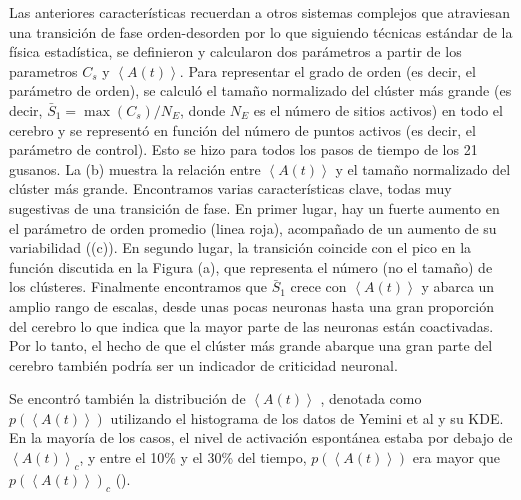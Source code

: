 Las anteriores  características recuerdan a otros sistemas complejos que atraviesan una transición de fase orden-desorden
por lo que siguiendo técnicas estándar de la  física estadística, se definieron y calcularon dos parámetros a partir de los parametros $C_s$ y $\left\langle A(t) \right\rangle$.  Para representar el grado de orden (es decir, el parámetro de orden), se calculó el tamaño normalizado del clúster más grande (es decir, $\bar{S}_1 = \max(C_s)/N_{E}$, donde $N_E$  es el número de sitios activos) en todo el cerebro y se representó en función del número de puntos activos (es decir, el parámetro de control).  Esto se hizo para todos los pasos de tiempo de los 21 gusanos. La (b) muestra la relación entre $\left\langle A(t) \right\rangle$ y el tamaño normalizado del clúster más grande.  Encontramos  varias características clave, todas muy sugestivas de una transición de fase.  En primer lugar, hay un fuerte aumento en el parámetro de orden promedio (linea roja), acompañado de un aumento de su variabilidad ((c)). En segundo lugar, la transición coincide con el pico en la función discutida en la Figura (a), que representa el número (no el tamaño) de los clústeres.  Finalmente encontramos que $\bar{S}_1$ crece con $\left\langle A(t) \right\rangle$  y abarca un amplio rango de escalas, desde unas pocas neuronas hasta una gran proporción del cerebro  lo que indica que la mayor parte de las neuronas están coactivadas.     Por lo tanto, el hecho de que el clúster más grande abarque una gran parte del cerebro también podría ser un indicador de criticidad neuronal.


Se encontró también  la distribución de $\left\langle A(t) \right\rangle$ , denotada como $p(\left\langle A(t) \right\rangle)$ utilizando el histograma de los datos de Yemini et al y su KDE. En la mayoría de los casos, el nivel de activación espontánea estaba por debajo de $\left\langle A(t) \right\rangle_c$, y entre el 10\% y el 30\% del tiempo,  $p(\left\langle A(t) \right\rangle)$ era mayor que  $p(\left\langle A(t) \right\rangle)_c$ (). 



